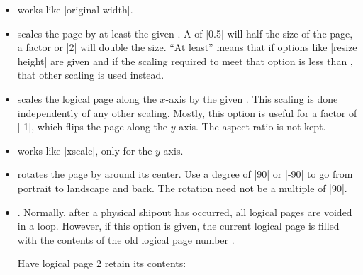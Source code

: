\begin{command}{\pgfpageslogicalpageoptions{}}
\begin{itemize}
            You need this option only for special logical pages that have a
            height or width different from the normal one and for which you
            will (later on) set these sizes yourself.
        \item {} works like
            |original width|.
        \item {} scales the page by at least the
            given . A  of |0.5| will half the size of
            the page, a factor or |2| will double the size. ``At least'' means
            that if options like |resize height| are given and if the scaling
            required to meet that option is less than , that other
            scaling is used instead.
        \item {} scales the logical page along
            the $x$-axis by the given . This scaling is done
            independently of any other scaling. Mostly, this option is useful
            for a factor of |-1|, which flips the page along the $y$-axis. The
            aspect ratio is not kept.
        \item {} works like |xscale|, only for
            the $y$-axis.
        \item {} rotates the page by
             around its center. Use a degree of |90| or |-90| to
            go from portrait to landscape and back. The rotation need not be a
            multiple of |90|.
        \item {}. Normally, after
            a physical shipout has occurred, all logical pages are voided in a
            loop. However, if this option is given, the current logical page is
            filled with the contents of the old logical page number
            .

            \example Have logical page 2 retain its contents:
\begin{codeexample}
\end{codeexample}


\end{itemize}
\end{command}

